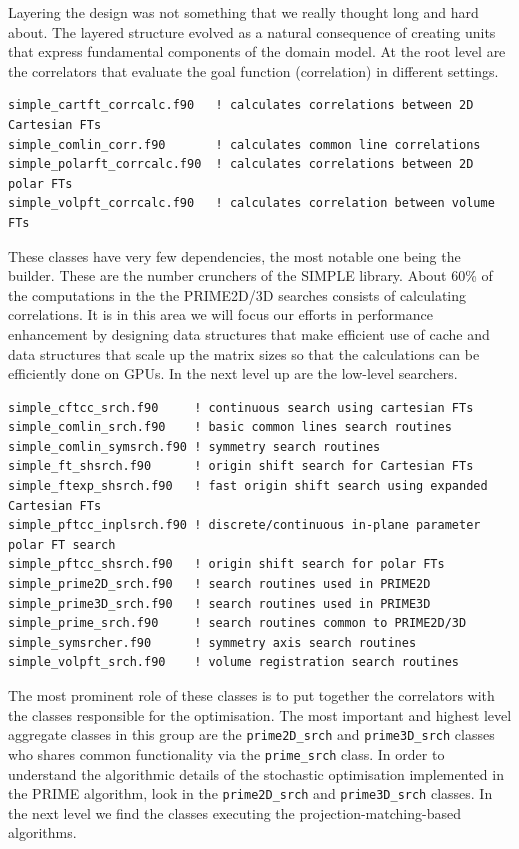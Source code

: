\documentclass[a4paper,11pt]{article}
\begin{document}
Layering the design was not something that we really thought long and hard about. The layered structure evolved as a natural consequence of creating units that express fundamental components of the domain model. At the root level are the correlators that evaluate the goal function (correlation) in different settings.
\begin{verbatim}
simple_cartft_corrcalc.f90   ! calculates correlations between 2D Cartesian FTs
simple_comlin_corr.f90       ! calculates common line correlations
simple_polarft_corrcalc.f90  ! calculates correlations between 2D polar FTs 
simple_volpft_corrcalc.f90   ! calculates correlation between volume FTs
\end{verbatim}
These classes have very few dependencies, the most notable one being the builder. These are the number crunchers of the SIMPLE library. About 60\% of the computations in the the PRIME2D/3D searches consists of calculating correlations. It is in this area we will focus our efforts in performance enhancement by designing data structures that make efficient use of cache and data structures that scale up the matrix sizes so that the calculations can be efficiently done on GPUs. In the next level up are the low-level searchers.
\begin{verbatim}
simple_cftcc_srch.f90     ! continuous search using cartesian FTs
simple_comlin_srch.f90    ! basic common lines search routines
simple_comlin_symsrch.f90 ! symmetry search routines
simple_ft_shsrch.f90      ! origin shift search for Cartesian FTs
simple_ftexp_shsrch.f90   ! fast origin shift search using expanded Cartesian FTs
simple_pftcc_inplsrch.f90 ! discrete/continuous in-plane parameter polar FT search
simple_pftcc_shsrch.f90   ! origin shift search for polar FTs
simple_prime2D_srch.f90   ! search routines used in PRIME2D
simple_prime3D_srch.f90   ! search routines used in PRIME3D
simple_prime_srch.f90     ! search routines common to PRIME2D/3D
simple_symsrcher.f90      ! symmetry axis search routines
simple_volpft_srch.f90    ! volume registration search routines
\end{verbatim}
The most prominent role of these classes is to put together the correlators with the classes responsible for the optimisation. The most important and highest level aggregate classes in this group are the \texttt{prime2D\_srch} and \texttt{prime3D\_srch} classes who shares common functionality via the \texttt{prime\_srch} class. In order to understand the algorithmic details of the stochastic optimisation implemented in the PRIME algorithm, look in the \texttt{prime2D\_srch} and \texttt{prime3D\_srch} classes. In the next level we find the classes executing the projection-matching-based algorithms.
\end{document}
